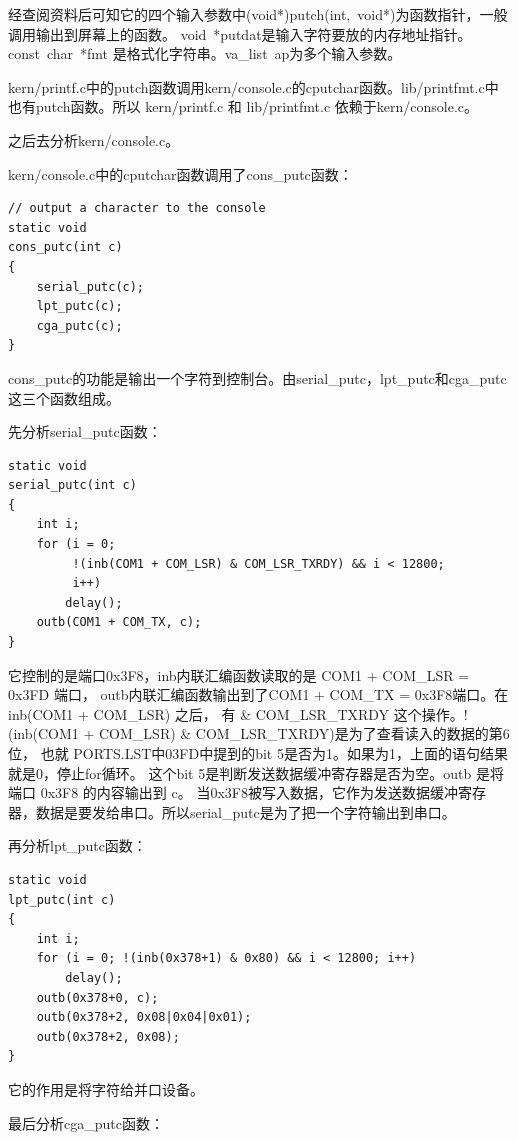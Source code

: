 \documentclass[12pt,a4paper,UTF8]{article}
\begin{document}
经查阅资料后可知它的四个输入参数中(void*)putch(int,\ void*)为函数指针，一般调用输出到屏幕上的函数。
void\ *putdat是输入字符要放的内存地址指针。const\ char\ *fmt 是格式化字符串。va\_list\ ap为多个输入参数。

kern/printf.c中的putch函数调用kern/console.c的cputchar函数。lib/printfmt.c中也有putch函数。所以 kern/printf.c 和 lib/printfmt.c 依赖于kern/console.c。

之后去分析kern/console.c。

kern/console.c中的cputchar函数调用了cons\_putc函数：

\begin{lstlisting}[style=CPP]
// output a character to the console
static void
cons_putc(int c)
{
	serial_putc(c);
	lpt_putc(c);
	cga_putc(c);
}
\end{lstlisting}

cons\_putc的功能是输出一个字符到控制台。由serial\_putc，lpt\_putc和cga\_putc这三个函数组成。

先分析serial\_putc函数：

\begin{lstlisting}[style=CPP]
static void
serial_putc(int c)
{
	int i;
	for (i = 0;
	     !(inb(COM1 + COM_LSR) & COM_LSR_TXRDY) && i < 12800;
	     i++)
		delay();
	outb(COM1 + COM_TX, c);
}
\end{lstlisting}

它控制的是端口0x3F8，inb内联汇编函数读取的是 COM1 + COM\_LSR = 0x3FD 端口，
outb内联汇编函数输出到了COM1 + COM\_TX = 0x3F8端口。在 inb(COM1 + COM\_LSR) 之后，
有 \& COM\_LSR\_TXRDY 这个操作。!(inb(COM1 + COM\_LSR) \& COM\_LSR\_TXRDY)是为了查看读入的数据的第6位，
也就 PORTS.LST中03FD中提到的bit 5是否为1。如果为1，上面的语句结果就是0，停止for循环。
这个bit 5是判断发送数据缓冲寄存器是否为空。outb 是将端口 0x3F8 的内容输出到 c。
当0x3F8被写入数据，它作为发送数据缓冲寄存器，数据是要发给串口。所以serial\_putc是为了把一个字符输出到串口。

再分析lpt\_putc函数：

\begin{lstlisting}[style=CPP]
static void
lpt_putc(int c)
{
	int i;
	for (i = 0; !(inb(0x378+1) & 0x80) && i < 12800; i++)
		delay();
	outb(0x378+0, c);
	outb(0x378+2, 0x08|0x04|0x01);
	outb(0x378+2, 0x08);
}
\end{lstlisting}

它的作用是将字符给并口设备。

最后分析cga\_putc函数：
\end{document}
